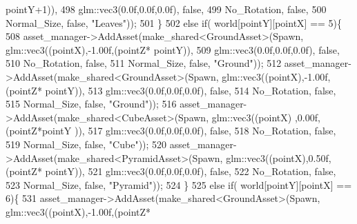 \begin{DoxyCode}
      pointY+1)),
498                                                              glm::vec3(0.0f,0.0f,0.0f), \textcolor{keyword}{false},
499                                                              No\_Rotation, \textcolor{keyword}{false},
500                                                              Normal\_Size, \textcolor{keyword}{false}, \textcolor{stringliteral}{"Leaves"}));
501    \}
502     \textcolor{keywordflow}{else} \textcolor{keywordflow}{if}( world[pointY][pointX] == 5)\{
508             asset\_manager->AddAsset(make\_shared<GroundAsset>(Spawn, glm::vec3((pointX),-1.00f,(pointZ*
      pointY)),
509                                                              glm::vec3(0.0f,0.0f,0.0f), \textcolor{keyword}{false},
510                                                              No\_Rotation, \textcolor{keyword}{false},
511                                                              Normal\_Size, \textcolor{keyword}{false}, \textcolor{stringliteral}{"Ground"}));
512             asset\_manager->AddAsset(make\_shared<GroundAsset>(Spawn, glm::vec3((pointX),-1.00f,(pointZ*
      pointY)),
513                                                              glm::vec3(0.0f,0.0f,0.0f), \textcolor{keyword}{false},
514                                                              No\_Rotation, \textcolor{keyword}{false},
515                                                              Normal\_Size, \textcolor{keyword}{false}, \textcolor{stringliteral}{"Ground"}));
516             asset\_manager->AddAsset(make\_shared<CubeAsset>(Spawn, glm::vec3((pointX)  ,0.00f,(pointZ*pointY
      )), 
517                                                            glm::vec3(0.0f,0.0f,0.0f), \textcolor{keyword}{false},
518                                                            No\_Rotation, \textcolor{keyword}{false},
519                                                            Normal\_Size, \textcolor{keyword}{false}, \textcolor{stringliteral}{"Cube"}));
520             asset\_manager->AddAsset(make\_shared<PyramidAsset>(Spawn, glm::vec3((pointX),0.50f,(pointZ*
      pointY)),
521                                                               glm::vec3(0.0f,0.0f,0.0f), \textcolor{keyword}{false},
522                                                               No\_Rotation, \textcolor{keyword}{false},
523                                                               Normal\_Size, \textcolor{keyword}{false}, \textcolor{stringliteral}{"Pyramid"}));
524    \}
525     \textcolor{keywordflow}{else} \textcolor{keywordflow}{if}( world[pointY][pointX] == 6)\{
531             asset\_manager->AddAsset(make\_shared<GroundAsset>(Spawn, glm::vec3((pointX),-1.00f,(pointZ*

\end{DoxyCode}
